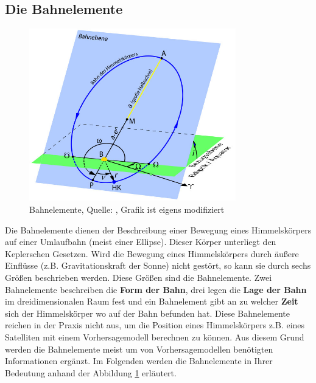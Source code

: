 \subsection{Die Bahnelemente}
\begin{figure}[h]                                                                           %
	\centering                                                                            	%
	\includegraphics[width=0.8\textwidth]{./images/bahnelemente.jpg}                        %
	\caption[Bahnelemente]{Bahnelemente, Quelle: \cite{Wiki:Bahnel}, 
		Grafik ist eigens modifiziert}              
	\label{fig:bahnelemente}                                                                %
\end{figure}                                                                              	%
Die Bahnelemente dienen der Beschreibung einer Bewegung eines Himmelskörpers auf einer Umlaufbahn (meist einer Ellipse). Dieser Körper unterliegt den Keplerschen Gesetzen. Wird die Bewegung eines Himmelskörpers durch äußere Einflüsse (z.B. Gravitationskraft der Sonne) nicht gestört, so kann sie durch sechs Größen beschrieben werden. Diese Größen sind die Bahnelemente. Zwei Bahnelemente beschreiben die \textbf{Form der Bahn}, drei legen die \textbf{Lage der Bahn} im dreidimensionalen Raum fest und ein Bahnelement gibt an zu welcher \textbf{Zeit} sich der Himmelskörper wo auf der Bahn befunden hat. 
\newpar
Diese Bahnelemente reichen in der Praxis nicht aus, um die Position eines Himmelskörpers z.B. eines Satelliten mit einem Vorhersagemodell berechnen zu können. Aus diesem Grund werden die Bahnelemente meist um von Vorhersagemodellen benötigten Informationen ergänzt.       
Im Folgenden werden die Bahnelemente in Ihrer Bedeutung anhand der Abbildung \ref{fig:bahnelemente} erläutert. 

